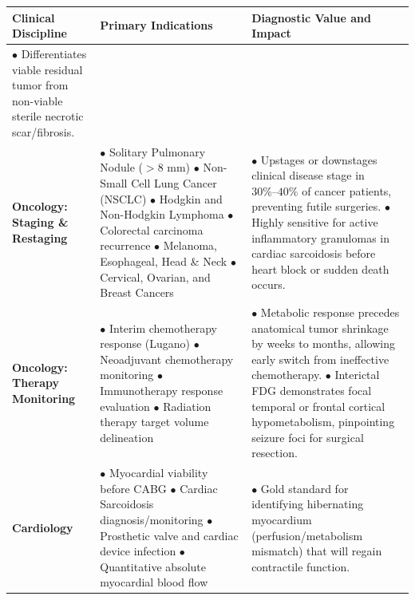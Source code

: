 \documentclass[11pt,a4paper]{article}
\begin{document}
\begin{longtable}{p{3.2cm}p{6cm}p{6cm}}
\toprule
\textbf{Clinical Discipline} & \textbf{Primary Indications} & \textbf{Diagnostic Value and Impact} \\
\midrule
\endfirsthead
\toprule
$\bullet$ Differentiates viable residual tumor from non-viable sterile necrotic scar/fibrosis. \\
\midrule
\endhead
\bottomrule
\endfoot
\textbf{Oncology: Staging \& Restaging} & 
$\bullet$ Solitary Pulmonary Nodule ($>8\text{ mm}$)\newline
$\bullet$ Non-Small Cell Lung Cancer (NSCLC)\newline
$\bullet$ Hodgkin and Non-Hodgkin Lymphoma\newline
$\bullet$ Colorectal carcinoma recurrence\newline
$\bullet$ Melanoma, Esophageal, Head \& Neck\newline
$\bullet$ Cervical, Ovarian, and Breast Cancers & 
$\bullet$ Upstages or downstages clinical disease stage in $30\%\text{--}40\%$ of cancer patients, preventing futile surgeries.\newline
$\bullet$ Highly sensitive for active inflammatory granulomas in cardiac sarcoidosis before heart block or sudden death occurs. \\
\midrule
\textbf{Oncology: Therapy Monitoring} & 
$\bullet$ Interim chemotherapy response (Lugano)\newline
$\bullet$ Neoadjuvant chemotherapy monitoring\newline
$\bullet$ Immunotherapy response evaluation\newline
$\bullet$ Radiation therapy target volume delineation & 
$\bullet$ Metabolic response precedes anatomical tumor shrinkage by weeks to months, allowing early switch from ineffective chemotherapy.\newline
$\bullet$ Interictal FDG demonstrates focal temporal or frontal cortical hypometabolism, pinpointing seizure foci for surgical resection. \\
\midrule
\textbf{Cardiology} & 
$\bullet$ Myocardial viability before CABG\newline
$\bullet$ Cardiac Sarcoidosis diagnosis/monitoring\newline
$\bullet$ Prosthetic valve and cardiac device infection\newline
$\bullet$ Quantitative absolute myocardial blood flow & 
$\bullet$ Gold standard for identifying hibernating myocardium (perfusion/metabolism mismatch) that will regain contractile function.\newline

\end{longtable}
\end{document}
